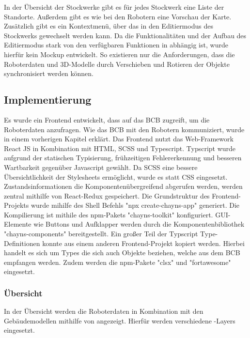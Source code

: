 In der Übersicht der Stockwerke gibt es für jedes Stockwerk eine Liste der Standorte. Außerdem gibt es wie bei den Robotern eine Vorschau der Karte. Zusätzlich gibt es ein Kontextmenü, über das in den Editiermodus des Stockwerks gewechselt werden kann. Da die Funktionalitäten und der Aufbau des Editiermodus stark von den verfügbaren Funktionen in \deckgl{} abhängig ist, wurde hierfür kein Mockup entwickelt. So existieren nur die Anforderungen, dass die Roboterdaten und 3D-Modelle durch Verschieben und Rotieren der Objekte synchronisiert werden können.  

\subsection{Implementierung}
Es wurde ein Frontend entwickelt, dass auf das \ac{BCB} zugreift, um die Roboterdaten anzufragen. Wie das \ac{BCB} mit den Robotern kommuniziert, wurde in einem vorherigen Kapitel erklärt. %
Das Frontend nutzt das Web-Framework React JS in Kombination mit HTML, SCSS und Typescript. Typscript wurde aufgrund der statischen Typisierung, frühzeitigen Fehlererkennung und besseren Wartbarkeit gegenüber Javascript gewählt. Da SCSS eine bessere Übersichtlichkeit der Stylesheets ermöglicht, wurde es statt CSS eingesetzt. Zustandsinformationen die Komponentenübergreifend abgerufen werden, werden zentral mithilfe von React-Redux gespeichert. Die Grundstruktur des Frontend-Projekts wurde mihilfe des Shell Befehls "npx create-chayns-app" generiert. Die Kompilierung ist mithile des npm-Pakets "chayns-toolkit" konfiguriert. GUI-Elemente wie Buttons und Aufklapper werden durch die Komponentenbibliothek "chayns-components" bereitgestellt. Ein großer Teil der Typscript Type-Definitionen konnte aus einem anderen Frontend-Projekt kopiert werden. Hierbei handelt es sich um Types die sich auch Objekte beziehen, welche aus dem \ac{BCB} empfangen werden. Zudem werden die npm-Pakete "clsx" und "fortawesome" eingesetzt.

\subsubsection{Übersicht}
In der Übersicht werden die Roboterdaten in Kombination mit den Gebäudemodellen mithilfe von \deckgl{} angezeigt. Hierfür werden verschiedene \deckgl{}-Layers eingesetzt.

